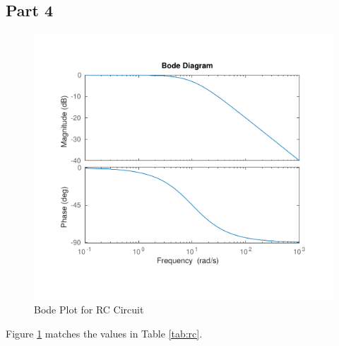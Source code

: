\documentclass[12pt]{article}
\begin{document}
		\subsection{Part 4}
		\begin{figure}[H]
			\centering
			\includegraphics[width=1\linewidth]{"Code/Fig/prelab_bode.png"}
			\caption{Bode Plot for RC Circuit}
			\label{fig:bode}
		\end{figure}
		Figure \ref{fig:bode} matches the values in Table \ref{tab:rc}. 
		\newpage
\end{document}
